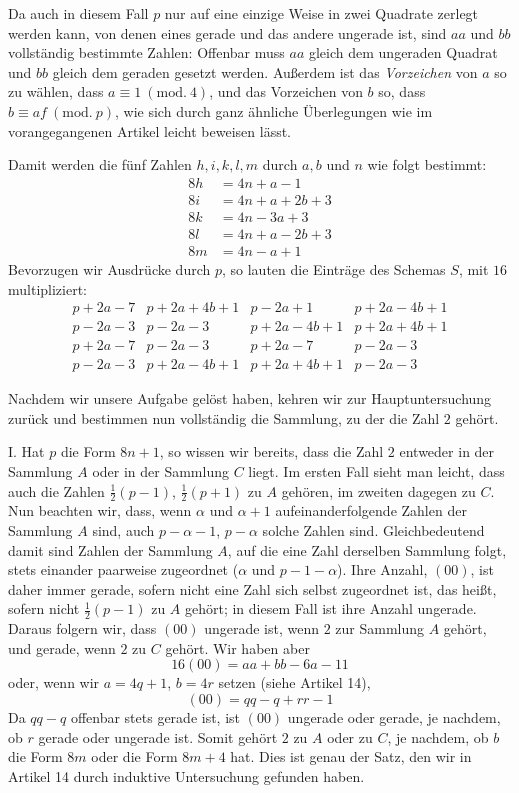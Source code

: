 Da auch in diesem Fall $p$ nur auf eine einzige Weise in zwei Quadrate zerlegt werden kann, von denen eines gerade und das andere ungerade ist, sind $aa$ und $bb$ vollständig bestimmte Zahlen: Offenbar muss $aa$ gleich dem ungeraden Quadrat und $bb$ gleich dem geraden gesetzt werden. Außerdem ist das \emph{Vorzeichen} von $a$ so zu wählen, dass $a\equiv1\ (\mathrm{mod.}\ 4)$, und das Vorzeichen von $b$ so, dass $b\equiv af\ (\mathrm{mod.}\ p)$, wie sich durch ganz ähnliche Überlegungen wie im vorangegangenen Artikel leicht beweisen lässt.

Damit werden die fünf Zahlen $h,i,k,l,m$ durch $a,b$ und $n$ wie folgt bestimmt:
\[
\begin{aligned}
8h&=4n+a-1\\
8i&=4n+a+2b+3\\
8k&=4n-3a+3\\
8l&=4n+a-2b+3\\
8m&=4n-a+1
\end{aligned}
\]
Bevorzugen wir Ausdrücke durch $p$, so lauten die Einträge des Schemas $S$, mit $16$ multipliziert:
\[
\begin{array}{l|l|l|l}
p+2a-7&p+2a+4b+1&p-2a+1&p+2a-4b+1\\
p-2a-3&p-2a-3&p+2a-4b+1&p+2a+4b+1\\
p+2a-7&p-2a-3&p+2a-7&p-2a-3\\
p-2a-3&p+2a-4b+1&p+2a+4b+1&p-2a-3
\end{array}
\]

%
Nachdem wir unsere Aufgabe gelöst haben, kehren wir zur Hauptuntersuchung zurück und bestimmen nun vollständig die Sammlung, zu der die Zahl $2$ gehört.

I. Hat $p$ die Form $8n+1$, so wissen wir bereits, dass die Zahl $2$ entweder in der Sammlung $A$ oder in der Sammlung $C$ liegt. Im ersten Fall sieht man leicht, dass auch die Zahlen $\frac12(p-1)$, $\frac12(p+1)$ zu $A$ gehören, im zweiten dagegen zu $C$. Nun beachten wir, dass, wenn $\alpha$ und $\alpha+1$ aufeinanderfolgende Zahlen der Sammlung $A$ sind, auch $p-\alpha-1$, $p-\alpha$ solche Zahlen sind. Gleichbedeutend damit sind Zahlen der Sammlung $A$, auf die eine Zahl derselben Sammlung folgt, stets einander paarweise zugeordnet ($\alpha$ und $p-1-\alpha$). Ihre Anzahl, $(00)$, ist daher immer gerade, sofern nicht eine Zahl sich selbst zugeordnet ist, das heißt, sofern nicht $\frac12(p-1)$ zu $A$ gehört; in diesem Fall ist ihre Anzahl ungerade. Daraus folgern wir, dass $(00)$ ungerade ist, wenn $2$ zur Sammlung $A$ gehört, und gerade, wenn $2$ zu $C$ gehört. Wir haben aber
\[
16(00)=aa+bb-6a-11
\]
oder, wenn wir $a=4q+1$, $b=4r$ setzen (siehe Artikel 14),
\[
(00)=qq-q+rr-1
\]
Da $qq-q$ offenbar stets gerade ist, ist $(00)$ ungerade oder gerade, je nachdem, ob $r$ gerade oder ungerade ist. Somit gehört $2$ zu $A$ oder zu $C$, je nachdem, ob $b$ die Form $8m$ oder die Form $8m+4$ hat. Dies ist genau der Satz, den wir in Artikel 14 durch induktive Untersuchung gefunden haben.

